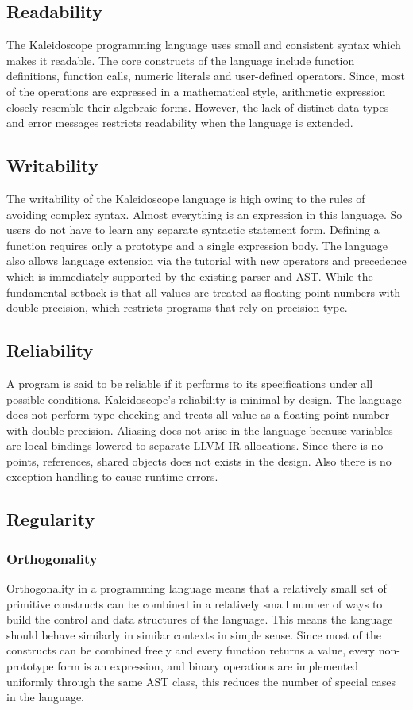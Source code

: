 \documentclass[acmlarge, nonacm]{acmart}
\begin{document}
\subsection{Readability}
The Kaleidoscope programming language uses small and consistent syntax which makes it readable. The core constructs of the language include function definitions, function calls, numeric literals and user-defined operators. Since, most of the operations are expressed in a mathematical style, arithmetic expression closely resemble their algebraic forms. However, the lack of distinct data types and error messages restricts readability when the language is extended.

\subsection{Writability}
The writability of the Kaleidoscope language is high owing to the rules of avoiding complex syntax. Almost everything is an expression in this language. So users do not have to learn any separate syntactic statement form. Defining a function requires only a prototype and a single expression body. The language also allows language extension via the tutorial with new operators and precedence which is immediately supported by the existing parser and AST. While the fundamental setback is that all values are treated as floating-point numbers with double precision, which restricts programs that rely on precision type.

\subsection{Reliability}
A program is said to be reliable if it performs to its specifications under all possible conditions. Kaleidoscope's reliability is minimal by design. The language does not perform type checking and treats all value as a floating-point number with double precision. Aliasing does not arise in the language because variables are local bindings lowered to separate LLVM IR allocations. Since there is no points, references, shared objects does not exists in the design. Also there is no exception handling to cause runtime errors.

\subsection{Regularity}
\subsubsection{Orthogonality}
Orthogonality in a programming language means that a relatively small set of primitive constructs can be combined in a relatively small number of ways to build the control and data structures of the language. \cite{sebesta} This means the language should behave similarly in similar contexts in simple sense. Since most of the constructs can be combined freely and every function returns a value, every non-prototype form is an expression, and binary operations are implemented uniformly through the same AST class, this reduces the number of special cases in the language.
\end{document}
